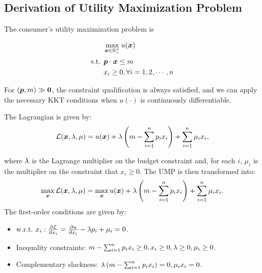 \subsection{Derivation of Utility Maximization Problem}\label{derivation-of-utility-maximization-problem}

The consumer's utility maximization problem is

$$
\begin{aligned}
& \max_{\bm x\in \mathbb R_+^n} u(\bm x)\\
\text{s.t. }& \bm p\cdot \bm x\le m\\
& x_i\ge 0,\forall i = 1,2,\cdots,n
\end{aligned}
$$

For \((\bm p,m)\gg\textbf 0\), the constraint qualification is always satisfied,
and we can apply the necessary KKT conditions when \(u(\cdot)\) is
continuously differentiable.

\noindent The Lagrangian is given by:
\[\mathcal L(\bm x,\lambda,\bold \mu) = u(\bm x)+\lambda\left(m-\sum_{i = 1}^n p_ix_i \right) + \sum_{i = 1}^n \mu_ix_i,\]

where $\lambda$ is the Lagrange multiplier on the budget constraint and, for each $i$, $\mu_i$ is the multiplier on the constraint that $x_i\ge 0$. The UMP is then transformed into:
\[\max_{\bm x} \mathcal L(\bm x,\lambda,\bold \mu) = \max_{\bm x} u(\bm x)+\lambda\left(m-\sum_{i = 1}^n p_ix_i \right) + \sum_{i = 1}^n \mu_ix_i.\]
The first-order conditions are given by:

\begin{itemize}
\item
  w.r.t.
  \(x_i: \frac{\partial \mathcal L}{\partial x_i} = \frac{\partial u}{\partial x_i} -\lambda p_i+ \mu_i = 0\).
\item
  Inequality constraints:
  \(m-\sum_{i = 1}^n p_ix_i\ge 0,x_i\ge 0,\lambda\ge 0,\mu_i\ge 0\).
\item
  Complementary slackness:
  \(\lambda\left(m-\sum_{i = 1}^n p_ix_i \right) = 0,\mu_ix_i = 0\).
\end{itemize}

